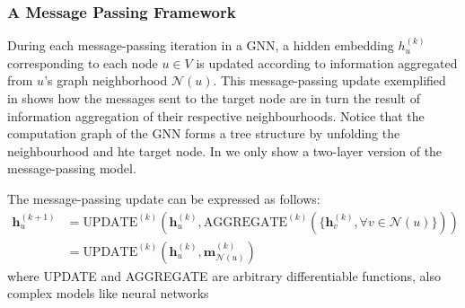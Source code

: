 \subsubsection{A Message Passing Framework}
During each message-passing iteration in a GNN, a hidden embedding $h_u^{(k)}$ corresponding to each node $u\in V$ is updated according to information aggregated
from $u$’s graph neighborhood $\mathcal{N} (u)$. This message-passing update exemplified in  shows how the messages sent to the target node are in turn the result of information aggregation of their respective neighbourhoods. Notice that the computation graph of the GNN forms a tree structure by unfolding the neighbourhood and hte target node. In  we only show a two-layer version of the message-passing model.



The message-passing update can be expressed as follows:
\begin{align*}
    \mathbf{h}_u^{(k+1)} &= \text{UPDATE}^{(k)}\left(\mathbf{h}_u^{(k)}, \text{AGGREGATE}^{(k)}(\{\mathbf{h}_v^{(k)}, \forall v \in \mathcal{N}(u)\})\right) \\
    &= \text{UPDATE}^{(k)}\left(\mathbf{h}_u^{(k)}, \mathbf{m}_{\mathcal{N}(u)}^{(k)}\right)
\end{align*}
where UPDATE and AGGREGATE are arbitrary differentiable functions, also complex models like neural networks


